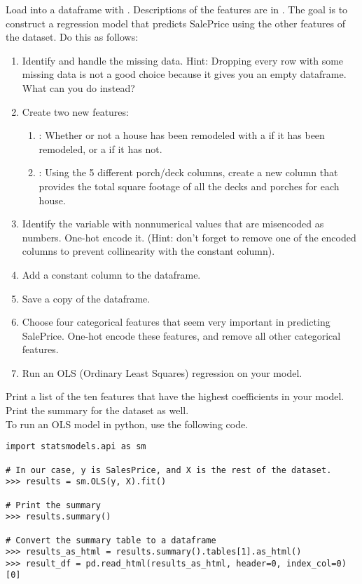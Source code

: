 \begin{problem}
\label{prob:boston-housing}
Load  into a dataframe with . Descriptions of the features are in .  
The goal is to construct a regression model that predicts SalePrice using the other features of the dataset.  Do this as follows:

\begin{enumerate}
	\item Identify and handle the missing data.  Hint: Dropping every row with some missing data is not a good choice because it gives you an empty dataframe.  What can you do instead?
	
	\item Create two new features:
		\begin{enumerate}
			\item {}: Whether or not a house has been remodeled with a  if it has been remodeled, or a  if it has not.
			\item {}: Using the 5 different porch/deck columns, create a new column that provides the total square footage of all the decks and porches for each house. 
		\end{enumerate}
    
	\item Identify the variable with nonnumerical values that are misencoded as numbers.  One-hot encode it. (Hint: don't forget to remove one of the encoded columns to prevent collinearity with the constant column).
    
    \item Add a constant column to the dataframe.

    \item Save a copy of the dataframe.

	\item Choose four categorical features that seem very important in predicting SalePrice. One-hot encode these features, and remove all other categorical features.
		
	\item Run an OLS (Ordinary Least Squares) regression on your model.  
\end{enumerate}
	
Print a list of the ten features that have the highest coefficients in your model.
Print the summary for the dataset as well. 
\\

\noindent To run an OLS model in python, use the following code.
\begin{lstlisting}
import statsmodels.api as sm

# In our case, y is SalesPrice, and X is the rest of the dataset. 
>>> results = sm.OLS(y, X).fit()

# Print the summary
>>> results.summary()

# Convert the summary table to a dataframe
>>> results_as_html = results.summary().tables[1].as_html()
>>> result_df = pd.read_html(results_as_html, header=0, index_col=0)[0]
\end{lstlisting}
\end{problem}

